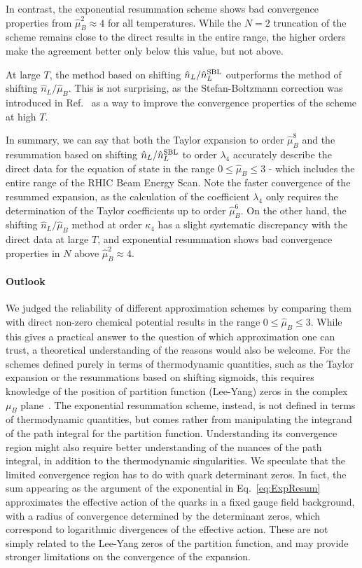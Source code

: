 \documentclass[twocolumn,showpacs,preprintnumbers,amsmath,amssymb,latexsym,prl,footinbib,floatfix,superscriptaddress]{revtex4-2}
\begin{document}
In contrast, the exponential resummation 
scheme shows bad convergence properties from $\hat{\mu}_B^2 \approx 4$ for all
temperatures. While the $N=2$ truncation of the scheme remains 
close to the direct results 
in the entire range, 
the higher orders make the agreement better only below this value, but not above.

At large $T$, the method 
based on shifting $\hat{n}_L / \hat{n}_L^{\rm{SBL}}$ outperforms 
the method of shifting $\hat{n}_L/\hat{\mu}_B$. This is not 
surprising, as the Stefan-Boltzmann correction was introduced in 
Ref.~\cite{Borsanyi:2022qlh} as a way to improve the convergence 
properties of the scheme at high $T$.

In summary, we can say that both
the Taylor expansion to order $\hat{\mu}_B^8$ and 
the resummation based on shifting $\hat{n}_L / \hat{n}_L^{\rm{SBL}}$ to 
order $\lambda_4$ accurately describe the direct data for the equation of 
state 
in the range $0 \leq \hat{\mu}_B \leq 3$ - which 
includes the entire range of the RHIC Beam 
Energy Scan. Note the faster convergence of the 
resummed expansion, as the calculation of 
the coefficient $\lambda_4$ only requires the 
determination of the Taylor coefficients up to order $\hat{\mu}_B^6$.
On the other hand, the 
shifting $\hat{n}_L / \hat{\mu}_B$ method at order $\kappa_4$ 
has a slight systematic discrepancy with the 
direct data at large $T$, and exponential 
resummation shows bad convergence 
properties in $N$ above $\hat{\mu}_B^2 \approx 4$.

\paragraph{Outlook}
We judged the reliability of different approximation schemes by 
comparing them with direct non-zero chemical potential results in the range
$0 \leq \hat{\mu}_B \leq 3$.
While this gives a practical 
answer to the question of which 
approximation one can trust, a theoretical understanding 
of the reasons would also be welcome. 
For the schemes defined purely in terms of thermodynamic quantities, 
such as the Taylor expansion
or the resummations based on shifting sigmoids, this 
requires knowledge of the 
position of partition function (Lee-Yang) zeros in the complex $\mu_B$ plane~\cite{Giordano:2019slo,Giordano:2019gev,Mukherjee:2021tyg,Dimopoulos:2021vrk,Bollweg:2022rps}.
The exponential resummation scheme, instead, is not defined 
in terms of thermodynamic quantities, 
but comes rather from manipulating the integrand of 
the path integral for the partition function. Understanding its convergence region
might also require better understanding of the 
nuances of the path integral, in addition
to the thermodynamic singularities. 
We speculate that the limited convergence region has to do with quark determinant zeros. 
In fact, the sum appearing as the argument of the exponential in Eq.~\eqref{eq:ExpResum} approximates the effective action 
of the quarks in a fixed gauge field background, with a radius of convergence determined by the determinant zeros, which 
correspond to logarithmic divergences of the effective action. These 
are not simply related to the Lee-Yang zeros of the 
partition function, and may provide stronger limitations 
on the convergence of the expansion.
\end{document}
